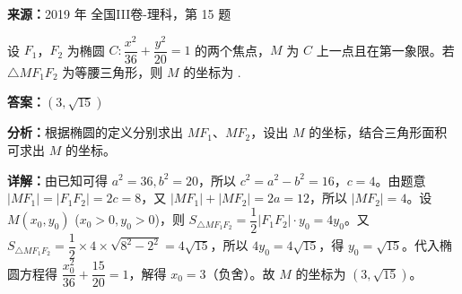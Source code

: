 \begin{question}[points=5]
\textbf{来源：}2019 年 全国III卷-理科，第 15 题\par
设 $F_1$，$F_2$ 为椭圆 $C: \dfrac{x^2}{36} + \dfrac{y^2}{20} = 1$ 的两个焦点，$M$ 为 $C$ 上一点且在第一象限。若 $\triangle MF_1F_2$ 为等腰三角形，则 $M$ 的坐标为 .
\fillin[{$(3,\sqrt{15})$}]
\begin{solution}
\textbf{答案：}$(3,\sqrt{15})$

\textbf{分析：}根据椭圆的定义分别求出 $MF_1$、$MF_2$，设出 $M$ 的坐标，结合三角形面积可求出 $M$ 的坐标。

\textbf{详解：}由已知可得 $a^2=36,b^2=20$，所以 $c^2=a^2-b^2=16$，$c=4$。由题意 $|MF_1| = |F_1F_2| = 2c = 8$，又 $|MF_1| + |MF_2| = 2a = 12$，所以 $|MF_2| = 4$。设 $M(x_0,y_0)$ ($x_0>0,y_0>0$)，则 $S_{\triangle MF_1F_2} = \dfrac{1}{2} |F_1F_2|\cdot y_0 = 4y_0$。又 $S_{\triangle MF_1F_2} = \dfrac{1}{2} \times 4 \times \sqrt{8^2-2^2} = 4\sqrt{15}$，所以 $4y_0 = 4\sqrt{15}$，得 $y_0 = \sqrt{15}$。代入椭圆方程得 $\dfrac{x_0^2}{36} + \dfrac{15}{20} = 1$，解得 $x_0 = 3$（负舍）。故 $M$ 的坐标为 $(3,\sqrt{15})$。
\end{solution}
\end{question}


